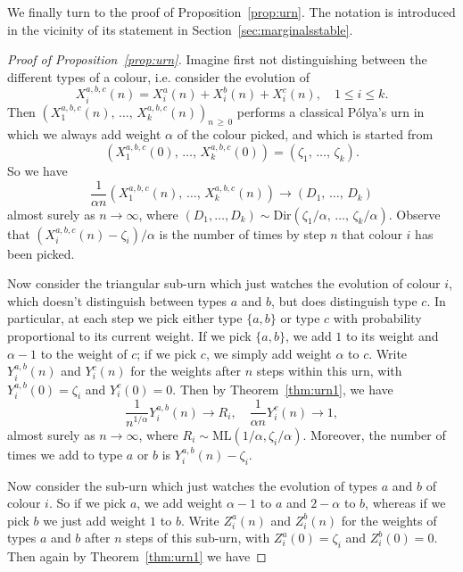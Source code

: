 \documentclass[10pt]{amsart}
\theoremstyle{definition}\newtheorem{defi}[theo]{Definition}\newtheorem{rema}[theo]{Remark}\newtheorem{exam}[theo]{Example}\newtheorem{exem}[theo]{Example}\newtheorem{nota}[theo]{Notation}
\newcommand{\ML}{\mathrm{ML}}
\newcommand{\Dir}{\mathrm{Dir}}
\begin{document}
We finally turn to the proof of Proposition~\ref{prop:urn}. The notation is introduced in the vicinity of its statement in Section~\ref{sec:marginalsstable}.

\begin{proof}[Proof of Proposition~\ref{prop:urn}]
Imagine first not distinguishing between the different types of a colour, i.e. consider the evolution of
\[
X^{a,b,c}_i(n) = X_i^a(n) + X^b_i(n) + X^c_i(n), \quad 1 \le i \le k.
\]
Then $(X^{a,b,c}_1(n),\, \ldots,\,X^{a,b,c}_k(n))_{n\,\ge\,0}$ performs a classical P{\'o}lya's urn in which we always add weight $\alpha$ of the colour picked, and which is started from
\[
\left(X^{a,b,c}_1(0),\,\ldots,\,X^{a,b,c}_k(0)\right) = \left(\zeta_1,\,\ldots,\,\zeta_k\right).
\]
So we have
\begin{equation}\label{eqn:(abc)limit}
\frac{1}{\alpha n} \left(X^{a,b,c}_1(n),\,\ldots,\, X^{a,b,c}_k(n)\right) \to \left(D_1,\, \ldots,\, D_k\right)
\end{equation}
almost surely as $n \to \infty$, where $(D_1, \ldots, D_k) \sim \Dir(\zeta_1/\alpha,\, \ldots, \,\zeta_k/\alpha)$. Observe that $(X^{a,b,c}_i(n) - \zeta_i)/\alpha$ is the number of times by step $n$ that colour $i$ has been picked.

Now consider the triangular sub-urn which just watches the evolution of colour $i$, which doesn't distinguish between types $a$ and $b$, but does distinguish type $c$. In particular, at each step we pick either type $\{a,b\}$ or type $c$ with probability proportional to its current weight. If we pick $\{a,b\}$, we add $1$ to its weight and $\alpha-1$ to the weight of $c$; if we pick $c$, we simply add weight $\alpha$ to $c$. Write $Y^{a,b}_i(n)$ and $Y^c_i(n)$ for the weights after $n$ steps within this urn, with $Y_i^{a,b}(0) = \zeta_i$ and $Y^c_i(0) = 0$. Then by Theorem~\ref{thm:urn1}, we have
\begin{equation}\label{eqn:(ab)climit}
\frac{1}{n^{1/\alpha}} Y_i^{a,b}(n) \to R_i, \quad \frac{1}{\alpha n} Y^c_i(n) \to 1,
\end{equation}
almost surely as $n \to \infty$, where $R_i \sim \ML(1/\alpha, \zeta_i/\alpha)$. Moreover, the number of times we add to type $a$ or $b$ is $Y_i^{a,b}(n) - \zeta_i$.

Now consider the sub-urn which just watches the evolution of types $a$ and $b$ of colour $i$. So if we pick $a$, we add weight $\alpha-1$ to $a$ and $2-\alpha$ to $b$, whereas if we pick $b$ we just add weight $1$ to $b$. Write $Z^a_i(n)$ and $Z^b_i(n)$ for the weights of types $a$ and $b$ after $n$ steps of this sub-urn, with $Z^a_i(0) = \zeta_i$ and $Z^b_i(0) = 0$. Then again by Theorem~\ref{thm:urn1} we have


\end{proof}
\end{document}
